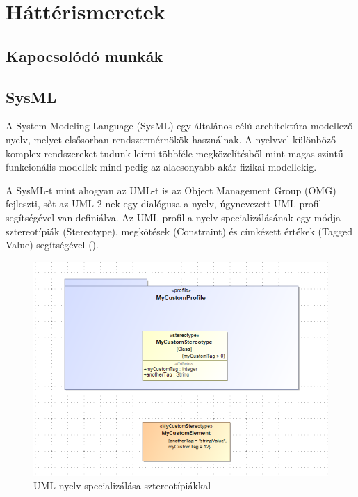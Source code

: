 \chapter{Háttérismeretek}

\section{Kapocsolódó munkák}

\section{SysML}

A System Modeling Language (SysML) egy általános célú architektúra modellező nyelv, melyet elsősorban rendszermérnökök használnak. A nyelvvel különböző komplex rendszereket tudunk leírni többféle megközelítésből mint magas szintű funkcionális modellek mind pedig az alacsonyabb akár fizikai modellekig.

A SysML-t mint ahogyan az UML-t is az Object Management Group (OMG) fejleszti, sőt az UML 2-nek egy dialógusa a nyelv, úgynevezett UML profil segítségével van definiálva. Az UML profil a nyelv specializálásának egy módja sztereotípiák (Stereotype), megkötések (Constraint) és címkézett értékek (Tagged Value) segítségével ().

\begin{figure}[!ht]
	\centering
	\includegraphics[width=150mm, keepaspectratio]{figures/preliminaries/custom-profile.png}
	\caption{UML nyelv specializálása sztereotípiákkal}
	\label{fig:custom-profile}
\end{figure}

